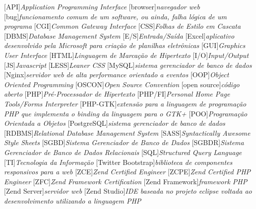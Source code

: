 
			[API]{\textit{Application Programming Interface}}
		[browser]{\textit{navegador web}}
			[bug]{\textit{funcionamento comum de um software, ou ainda, falha
lógica de um programa}}
			[CGI]{\textit{Common Gateway Interface }}
			[CSS]{\textit{Folhas de Estilo em Cascata}}
			[DBMS]{\textit{Database Management System}}
			[E/S]{\textit{Entrada/Saída}}
		[Excel]{\textit{aplicativo desenvolvido pela Microsoft para
criação de planilhas eletrônicas}}
			[GUI]{\textit{Graphics User Interface}}
			[HTML]{\textit{Linguagem de Marcação de Hipertexto}}
			[I/O]{\textit{Input/Output}}
			[JS]{\textit{Javascript}}
			[LESS]{\textit{Leaner CSS}}
		[MySQL]{\textit{sistema gerenciador de banco de dados}}
		[Nginx]{\textit{servidor web de alta performance orientado a
eventos}}
			[OOP]{\textit{Object Oriented Programming}}
		[OSCON]{\textit{Open Source Convention}}
	[open source]{\textit{código aberto}}
			[PHP]{\textit{Pré-Processador de Hipertexto}}
		[PHP/FI]{\textit{Personal Home Page Tools/Forms Interpreter}}
		[PHP-GTK]{\textit{extensão para a linguagem de programação PHP
que implementa o binding da linguagem para o GTK+}}
			[POO]{\textit{Programação Orientada a Objetos}}
	[PostgreSQL]{\textit{sistema gerenciador de banco de dados}}
		[RDBMS]{\textit{Relational Database Management System}}
			[SASS]{\textit{Syntactically Awesome Style Sheets}}
			[SGBD]{\textit{Sistema Gerenciador de Banco de Dados}}
			[SGBDR]{\textit{Sistema Gerenciador de Banco de Dados
Relacionais}}
			[SQL]{\textit{Structured Query Language}}
			[TI]{\textit{Tecnologia da Informação}}
[Twitter Bootstrap]{\textit{biblioteca de
componentes responsivos para a web}}
			[ZCE]{\textit{Zend Certified Engineer}}
			[ZCPE]{\textit{Zend Certified PHP Engineer}}
			[ZFC]{\textit{Zend Framework Certification}}
[Zend Framework]{\textit{framework PHP}}
	[Zend Server]{\textit{servidor web}}
	[Zend Studio]{\textit{IDE baseada no projeto eclipse voltada
ao desenvolvimento utilizando a linguagem PHP}}
